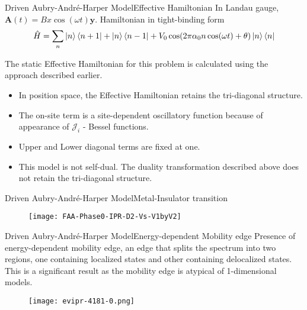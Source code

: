 \documentclass{beamer}
\begin{document}
\begin{frame}{Driven Aubry-Andr\'e-Harper Model}{Effective Hamiltonian}
In Landau gauge, $\mathbf{A}(t) = Bx \cos(\omega t) \hat{\mathbf{y}}$.
Hamiltonian in tight-binding form \footnotesize
\begin{equation}
 \hat{H} = \sum_{n} \ket{n}\bra{n+1} + \ket{n}\bra{n-1} + V_{0}\cos(2\pi\alpha_{0}n\cos(\omega t) + \theta)\ket{n}\bra{n}
\end{equation}\normalsize

\small
 The static Effective Hamiltonian for this problem is calculated using the approach described earlier.
 \begin{itemize}
  \item In position space, the Effective Hamiltonian retains the tri-diagonal structure.
  \item The on-site term is a site-dependent oscillatory function because of appearance of $\mathcal{J}_{i}$ - Bessel functions.
  \item Upper and Lower diagonal terms are fixed at one.
  \item This model is not self-dual. The duality transformation described above does not retain the tri-diagonal structure.
 \end{itemize} \normalsize
\end{frame}

\begin{frame}{Driven Aubry-Andr\'e-Harper Model}{Metal-Insulator transition}
 \begin{figure}[h]
  \centering
  \texttt{[image: FAA-Phase0-IPR-D2-Vs-V1byV2]}  
  \end{figure}
\end{frame}

\begin{frame}{Driven Aubry-Andr\'e-Harper Model}{Energy-dependent Mobility edge}
\footnotesize Presence of energy-dependent mobility edge, an edge that splits the spectrum into two regions, one containing localized states and 
other containing delocalized states. This is a significant result as the mobility edge is atypical of 1-dimensional models. \normalsize
\begin{figure}[h]
\centering
\texttt{[image: evipr-4181-0.png]}
\end{figure}
\end{frame}
\end{document}

